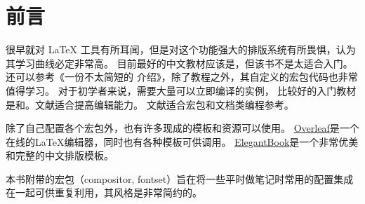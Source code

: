\chapter{前言}

很早就对 {\LaTeX} 工具有所耳闻，但是对这个功能强大的排版系统有所畏惧，认为其学习曲线必定非常高。
目前最好的中文教材应该是\cite{LIU13}，但该书不是太适合入门。
还可以参考《一份不太简短的 {\LaTeXe} 介绍》\cite{LSHORT}，除了教程之外，其自定义的宏包代码也非常值得学习。 
对于初学者来说，需要大量可以立即编译的实例， 
比较好的入门教材是\cite{GUIDE}和\cite{COOKBOOK}。文献\cite{COMPANION}适合提高编辑能力。
文献\cite{CLSGUIDE}适合宏包和文档类编程参考。

除了自己配置各个宏包外，也有许多现成的模板和资源可以使用。
\href{https://www.overleaf.com}{Overleaf}是一个在线的{\LaTeX}编辑器，同时也有各种模板可供调用。
\href{https://github.com/ElegantLaTeX/ElegantBook}{ElegantBook}是一个非常优美和完整的中文排版模板。

本书附带的宏包（compositor, fontset）旨在将一些平时做笔记时常用的配置集成在一起可供重复利用，其风格是非常简约的。
